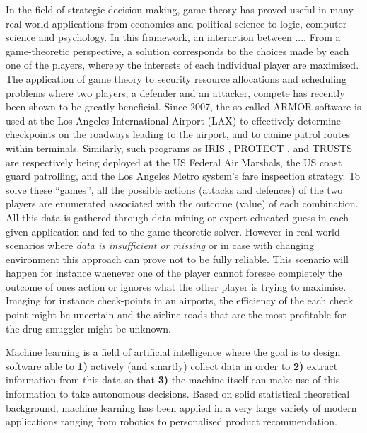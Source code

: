 In the field of strategic decision making, game theory has proved useful in many real-world applications from economics and political science to logic, computer science and psychology. In this framework, an interaction between .... 
From a game-theoretic perspective, a solution corresponds to the choices made by each one of the players, whereby the interests of each individual player are maximised. 
The application of game theory to security resource allocations and scheduling problems where two players, a defender and an attacker, compete  has recently been shown to be greatly beneficial.
Since 2007, the so-called ARMOR software \cite{pita2008deployed} is used at the Los Angeles International Airport (LAX) to effectively determine 
checkpoints on the roadways leading to the airport, and to canine patrol routes within terminals. 
Similarly, such programs as IRIS \cite{tsai2009iris}, PROTECT \cite{shieh2012protect}, and TRUSTS \cite{yin2012trusts} are respectively being deployed at the US Federal Air Marshals, the US coast guard patrolling, and the Los Angeles Metro system's fare inspection strategy. To solve these ``games'', all the possible actions (attacks and defences) of the two players are enumerated associated with the outcome (value) of each combination. All this data is gathered through data mining or expert educated guess in each given application and fed to the game theoretic solver. However in real-world scenarios where \textit{data is insufficient or missing} or in case with changing environment this approach can prove not to be fully reliable. This scenario will happen for instance whenever one of the player cannot foresee completely the outcome of ones action or ignores what the other player is trying to maximise. Imaging for instance check-points in an airports, the efficiency of the each check point might be uncertain and the airline roads that are the most profitable for the drug-smuggler might be unknown.

Machine learning is a field of artificial intelligence where the goal is to design software able to \textbf{ 1)} actively (and smartly) collect data in order to \textbf{2)}  extract information from this data so that \textbf{3)} the machine itself can make use of this information to take autonomous decisions.  Based on solid statistical theoretical background, machine learning has been applied in a very large variety of modern applications ranging from robotics to personalised product recommendation. 

